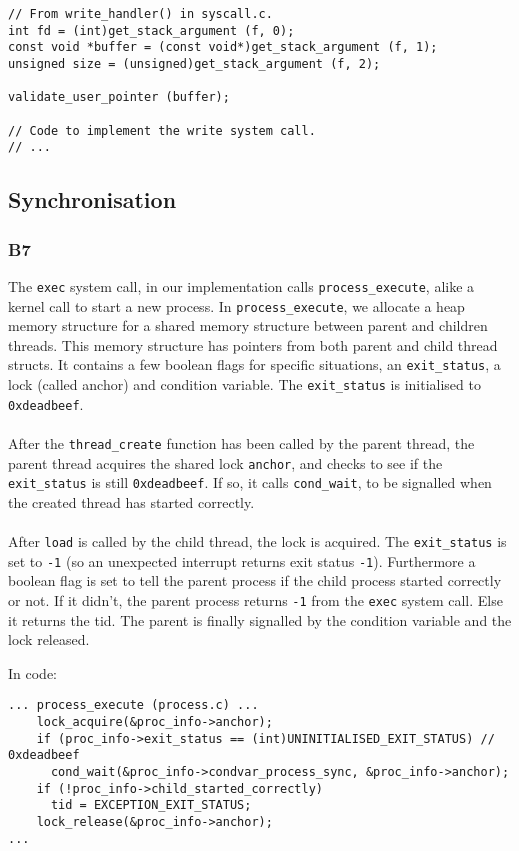 \documentclass[a4wide, 11pt]{article}
\newcommand{\tx}{\texttt}
\begin{document}
\begin{verbatim}
// From write_handler() in syscall.c.
int fd = (int)get_stack_argument (f, 0);
const void *buffer = (const void*)get_stack_argument (f, 1);
unsigned size = (unsigned)get_stack_argument (f, 2);

validate_user_pointer (buffer);

// Code to implement the write system call.
// ...
\end{verbatim}

\subsection{Synchronisation}
\subsubsection{B7}

The \tx{exec} system call, in our implementation calls \tx{process\_execute}, alike a kernel call to start a new process. In \tx{process\_execute}, we allocate a heap memory structure for a shared memory structure between parent and children threads. This memory structure has pointers from both parent and child thread structs. It contains a few boolean flags for specific situations, an \tx{exit\_status}, a lock (called anchor) and condition variable. The \tx{exit\_status} is initialised to \tx{0xdeadbeef}.
\\\\
After the \tx{thread\_create} function has been called by the parent thread, the parent thread acquires the shared lock \tx{anchor}, and checks to see if the \tx{exit\_status} is still \tx{0xdeadbeef}. If so, it calls \tx{cond\_wait}, to be signalled when the created thread has started correctly.
\\\\
After \texttt{load} is called by the child thread, the lock is acquired. The \tx{exit\_status} is set to \tx{-1} (so an unexpected interrupt returns exit status \tx{-1}). Furthermore a boolean flag is set to tell the parent process if the child process started correctly or not. If it didn't, the parent process returns \tx{-1} from the \texttt{exec} system call. Else it returns the tid. The parent is finally signalled by the condition variable and the lock released.

In code:

\begin{verbatim}
... process_execute (process.c) ...
    lock_acquire(&proc_info->anchor);
    if (proc_info->exit_status == (int)UNINITIALISED_EXIT_STATUS) // 0xdeadbeef
      cond_wait(&proc_info->condvar_process_sync, &proc_info->anchor);
    if (!proc_info->child_started_correctly)
      tid = EXCEPTION_EXIT_STATUS;
    lock_release(&proc_info->anchor);
...
\end{verbatim}
\end{document}
